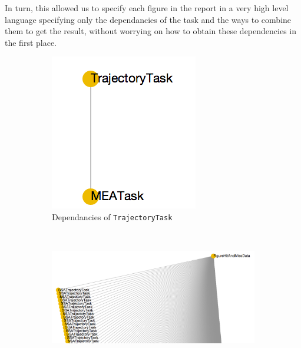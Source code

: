 In turn, this allowed us to specify each figure in the report in a very high level language specifying only the dependancies of the task and the ways to combine them to get the result, without worrying on how to obtain these dependencies in the first place.

\begin{figure}
    \centering
     \begin{subfigure}[t]{0.3\textwidth}
        \includegraphics[width=\textwidth]{images/TrajectoryTask.png}
        \caption{Dependancies of {\tt TrajectoryTask}}
        \label{fig:pipes_example:TrajectoryTask}
    \end{subfigure}
    ~
    \begin{subfigure}[t]{\textwidth}
        \includegraphics[width=\textwidth]{images/FigureHitAndMissData}

\end{subfigure}
\end{figure}
